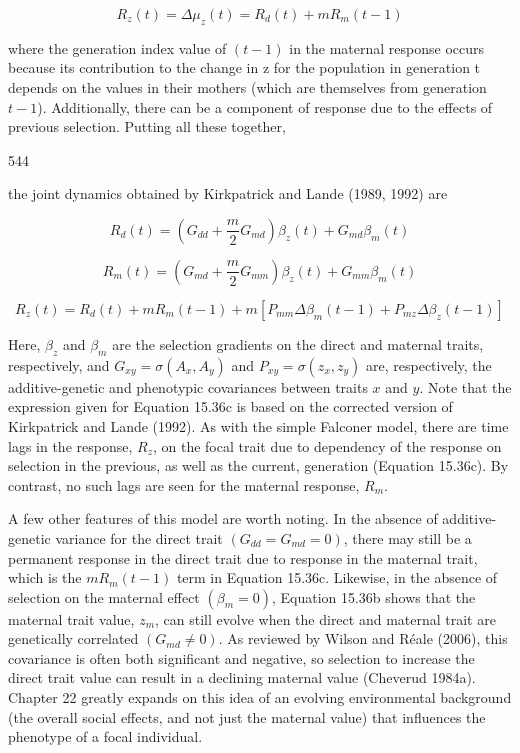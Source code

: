 \documentclass{article}
\begin{document}
\begin{equation}
R_{z}(t)=\Delta\mu_{z}(t)=R_{d}(t)+m R_{m}(t-1)
\tag{15.35b}
\label{eq:15_35b}
\end{equation}

where the generation index value of  $ (t-1) $ in the maternal response occurs because its contribution to the change in z for the population in generation t depends on the values in their mothers (which are themselves from generation  $ t-1 $). Additionally, there can be a component of response due to the effects of previous selection. Putting all these together,

544

the joint dynamics obtained by Kirkpatrick and Lande (1989, 1992) are

\begin{equation}
R_{d}(t)=\left(G_{d d}+\frac{m}{2}G_{m d}\right)\beta_{z}(t)+G_{m d}\beta_{m}(t)
\tag{15.36a}
\label{eq:15_36a}
\end{equation}

\begin{equation}
R_{m}(t)=\left(G_{md}+\frac{m}{2}G_{mm}\right)\beta_{z}(t)+G_{mm}\beta_{m}(t)
\tag{15.36b}
\label{eq:15_36b}
\end{equation}

\begin{equation}
R_{z}(t)=R_{d}(t)+mR_{m}(t-1)+m\left[P_{mm}\Delta\beta_{m}(t-1)+P_{mz}\Delta\beta_{z}(t-1)\right]
\tag{15.36c}
\label{eq:15_36c}
\end{equation}

Here,  $ \beta_z $ and  $ \beta_m $ are the selection gradients on the direct and maternal traits, respectively, and  $ G_{xy} = \sigma(A_x, A_y) $ and  $ P_{xy} = \sigma(z_x, z_y) $ are, respectively, the additive-genetic and phenotypic covariances between traits  $ x $ and  $ y $. Note that the expression given for Equation 15.36c is based on the corrected version of Kirkpatrick and Lande (1992). As with the simple Falconer model, there are time lags in the response,  $ R_z $, on the focal trait due to dependency of the response on selection in the previous, as well as the current, generation (Equation 15.36c). By contrast, no such lags are seen for the maternal response,  $ R_m $.

A few other features of this model are worth noting. In the absence of additive-genetic variance for the direct trait  $ (G_{dd} = G_{md} = 0) $, there may still be a permanent response in the direct trait due to response in the maternal trait, which is the  $ mR_m(t-1) $ term in Equation 15.36c. Likewise, in the absence of selection on the maternal effect  $ (\beta_m = 0) $, Equation 15.36b shows that the maternal trait value,  $ z_m $, can still evolve when the direct and maternal trait are genetically correlated  $ (G_{md} \neq 0) $. As reviewed by Wilson and Réale (2006), this covariance is often both significant and negative, so selection to increase the direct trait value can result in a declining maternal value (Cheverud 1984a). Chapter 22 greatly expands on this idea of an evolving environmental background (the overall social effects, and not just the maternal value) that influences the phenotype of a focal individual.
\end{document}
